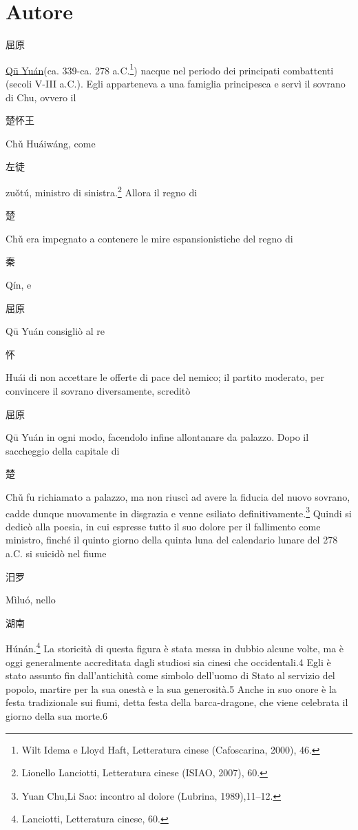 \documentclass[12pt,titlepage]{article}
\title{\textbf{\begin{CJK*}{UTF8}{gbsn}离骚\end{CJK*} LÍ SĀO INCONTRO AL DOLORE, POEMA DI \begin{CJK*}{UTF8}{gbsn}屈原\end{CJK*} QŪ YUÁN} }
\author{Francesca Godi}
\date{}
\begin{document}
	\maketitle
\section{Autore}
\begin{CJK*}{UTF8}{gbsn}
屈原
\end{CJK*}
\underline{Qū Yuán}(ca. 339-ca. 278 a.C.\footnote{Wilt Idema e Lloyd Haft, Letteratura cinese (Cafoscarina, 2000), 46.}) nacque nel periodo dei principati combattenti (secoli V-III a.C.). Egli apparteneva a una famiglia principesca e servì il sovrano di Chu, ovvero il 
\begin{CJK*}{UTF8}{gbsn}楚怀王\end{CJK*} 
Chǔ Huáiwáng, come 
\begin{CJK*}{UTF8}{gbsn}左徒 \end{CJK*}
zuǒtú, ministro di sinistra.\footnote{Lionello Lanciotti, Letteratura cinese (ISIAO, 2007), 60.} Allora il regno di 
\begin{CJK*}{UTF8}{gbsn}楚 \end{CJK*}
Chǔ era impegnato a contenere le mire espansionistiche del regno di 
\begin{CJK*}{UTF8}{gbsn}秦\end{CJK*} 
Qín, e 
\begin{CJK*}{UTF8}{gbsn}屈原\end{CJK*}
 Qū Yuán consigliò al re 
\begin{CJK*}{UTF8}{gbsn}怀\end{CJK*}Huái di non accettare le offerte di pace del nemico; il partito moderato, per convincere il sovrano diversamente, screditò \begin{CJK*}{UTF8}{gbsn}屈原 \end{CJK*}Qū Yuán in ogni modo, facendolo infine allontanare da palazzo. Dopo il saccheggio della capitale di \begin{CJK*}{UTF8}{gbsn}楚 \end{CJK*}Chǔ fu richiamato a palazzo, ma non riuscì ad avere la fiducia del nuovo sovrano, cadde dunque nuovamente in disgrazia e venne esiliato definitivamente.\footnote{Yuan Chu,Li Sao: incontro al dolore (Lubrina, 1989),11–12.} Quindi si dedicò alla poesia, in cui espresse tutto il suo dolore per il fallimento come ministro, finché il quinto giorno della quinta luna del calendario lunare del 278 a.C. si suicidò nel fiume \begin{CJK*}{UTF8}{gbsn}汨罗 \end{CJK*}Mìluó, nello \begin{CJK*}{UTF8}{gbsn}湖南 \end{CJK*}Húnán.\footnote{Lanciotti, Letteratura cinese, 60.} La storicità di questa figura è stata messa in dubbio alcune volte, ma è oggi generalmente accreditata dagli studiosi sia cinesi che occidentali.4 Egli è stato assunto fin dall'antichità come simbolo dell'uomo di Stato al servizio del popolo, martire per la sua onestà e la sua generosità.5 Anche in suo onore è la festa tradizionale sui fiumi, detta festa della barca-dragone, che viene celebrata il giorno della sua morte.6
\end{document}
